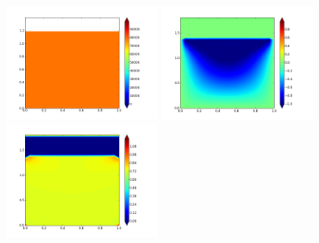 \documentclass{article}
\begin{document}
\begin{figure}
{\includegraphics[width=2in]{contour-P75-ALEsin.png} \hspace{-20pt}
\includegraphics[width=2in]{contour-V75-IBsin.png} \hspace{-20pt}
\includegraphics[width=2in]{contour-P75-IBsin.png} 
}
\vspace{-8pt}
\end{figure}
\end{document}
